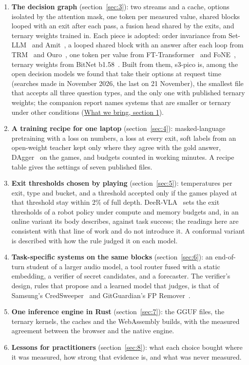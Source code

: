 \documentclass[10pt]{article}
\begin{document}
\begin{enumerate}
\item \textbf{The decision graph} (section~\ref{sec:3}): two streams and a cache, options isolated by the attention mask, one token per measured value, shared blocks looped with an exit after each pass, a fusion head shared by the exits, and ternary weights trained in. Each piece is adopted: order invariance from Set-LLM~\cite{egressy2025setllm} and Amit~\cite{amit2026permutation}, a looped shared block with an answer after each loop from TRM~\cite{jolicoeur2025trm} and Ouro~\cite{zhu2025ouro}, one token per value from FT-Transformer~\cite{gorishniy2021ftt} and FoNE~\cite{zhou2025fone}, ternary weights from BitNet b1.58~\cite{ma2024bitnet}. Built from them, s3-pico is, among the open decision models we found that take their options at request time (searches made in November 2026, the last on 21 November), the smallest file that accepts all three question types, and the only one with published ternary weights; the companion report names systems that are smaller or ternary under other conditions (\href{https://maxgfr.github.io/skycmd/novelty/\#_1-a-decision-model-in-251-kb}{What we bring, section 1}).
\item \textbf{A training recipe for one laptop} (section~\ref{sec:4}): masked-language pretraining with a loss on numbers, a loss at every exit, soft labels from an open-weight teacher kept only where they agree with the gold answer, DAgger~\cite{ross2011dagger} on the games, and budgets counted in working minutes. A recipe table gives the settings of seven published files.
\item \textbf{Exit thresholds chosen by playing} (section~\ref{sec:5}): temperatures per exit, type and bucket, and a threshold accepted only if the games played at that threshold stay within 2\% of full depth. DeeR-VLA~\cite{yue2024deer} sets the exit thresholds of a robot policy under compute and memory budgets and, in an online variant its body describes, against task success; the readings here are consistent with that line of work and do not introduce it. A conformal variant is described with how the rule judged it on each model.
\item \textbf{Task-specific systems on the same blocks} (section~\ref{sec:6}): an end-of-turn student of a larger audio model, a tool router fused with a static embedding, a verifier of secret candidates, and a forecaster. The verifier's design, rules that propose and a learned model that judges, is that of Samsung's CredSweeper~\cite{credsweeper} and GitGuardian's FP Remover~\cite{fpremover}.
\item \textbf{One inference engine in Rust} (section~\ref{sec:7}): the GGUF files, the ternary kernels, the caches and the WebAssembly builds, with the measured agreement between the browser and the native engine.
\item \textbf{Lessons for practitioners} (section~\ref{sec:8}): what each choice bought where it was measured, how strong that evidence is, and what was never measured.
\end{enumerate}
\end{document}
